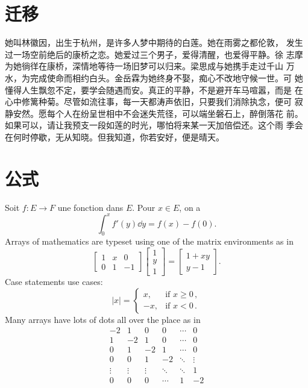 \documentclass[a4paper, 11pt,twoside=false]{scrartcl} %
\begin{document}

\maketitle

\tableofcontents %
\newpage


\section{迁移}
她叫林徽因，出生于杭州，是许多人梦中期待的白莲。她在雨雾之都伦敦，
发生过一场空前绝后的康桥之恋。她爱过三个男子，爱得清醒，也爱得平静。徐
志摩为她徜徉在康桥，深情地等待一场旧梦可以归来。梁思成与她携手走过千山
万水，为完成使命而相约白头。金岳霖为她终身不娶，痴心不改地守候一世。可
她懂得人生飘忽不定，要学会随遇而安。真正的平静，不是避开车马喧嚣，而是
在心中修篱种菊。尽管如流往事，每一天都涛声依旧，只要我们消除执念，便可
寂静安然。愿每个人在纷呈世相中不会迷失荒径，可以端坐磐石上，醉倒落花
前。如果可以，请让我预支一段如莲的时光，哪怕将来某一天加倍偿还。这个雨
季会在何时停歇，无从知晓。但我知道，你若安好，便是晴天。
\section{公式}
Soit $f:E\to F$ une fonction  dans $E$. Pour $x\in E$, on a
\[
\int_0^x f'(y)\dd{y}=f(x)-f(0).
\]
Arrays of mathematics are typeset using one of the matrix environments as 
in
\[
\begin{bmatrix}
1 & x & 0 \\
0 & 1 & -1
\end{bmatrix}\begin{bmatrix}
1  \\
y  \\
1
\end{bmatrix}
=\begin{bmatrix}
1+xy  \\
y-1
\end{bmatrix}.
\]
Case statements use cases:
\[
|x|=\begin{cases}
x, & \text{if }x\geq 0\,,  \\
-x, & \text{if }x< 0\,.
\end{cases}
\]
Many arrays have lots of dots all over the place as in
\[
\begin{matrix}
-2 & 1 & 0 & 0 & \cdots & 0  \\
1 & -2 & 1 & 0 & \cdots & 0  \\
0 & 1 & -2 & 1 & \cdots & 0  \\
0 & 0 & 1 & -2 & \ddots & \vdots \\
\vdots & \vdots & \vdots & \ddots & \ddots & 1  \\
0 & 0 & 0 & \cdots & 1 & -2
\end{matrix}
\]
\end{document}

